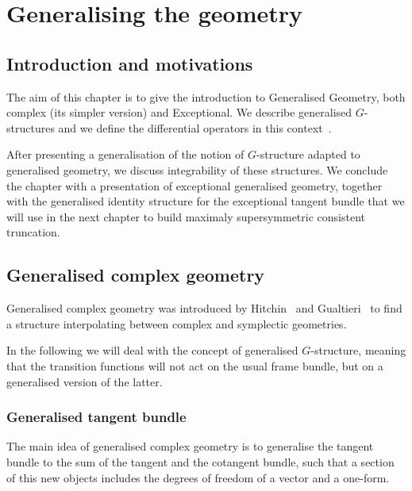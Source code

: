 \documentclass[debug]{phd}
\begin{document}
	\chapter{Generalising the geometry}
	\label{chapEGG}
		\section{Introduction and motivations}
			The aim of this chapter is to give the introduction to Generalised Geometry, both complex (its simpler version) and Exceptional.
			We describe generalised $G$-structures and we define the differential operators in this context~\cite{waldram1, waldram2, waldram3, waldram4}.
			
			After presenting a generalisation of the notion of $G$-structure adapted to generalised geometry, we discuss integrability of these structures.
			We conclude the chapter with a presentation of exceptional generalised geometry, together with the generalised identity structure for the exceptional tangent bundle that we will use in the next chapter to build maximaly supersymmetric consistent truncation.
%
		\section{Generalised complex geometry}
				Generalised complex geometry was introduced by Hitchin~\cite{hitch1} and Gualtieri~\cite{gualtphd} to find a structure interpolating between complex and symplectic geometries.
				
				In the following we will deal with the concept of generalised $G$-structure, meaning that the transition functions will not act on the usual frame bundle, but on a generalised version of the latter.
			\subsection{Generalised tangent bundle}
					The main idea of generalised complex geometry is to generalise the tangent bundle to the sum of the tangent and the cotangent bundle, such that a section of this new objects includes the degrees of freedom of a vector and a one-form.
					
\end{document}

